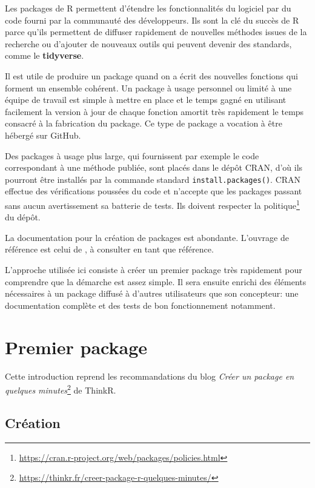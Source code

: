 \documentclass[
  11pt,
  french,
  a4paper,
  extrafontsizes,onecolumn,openright
  ]{memoir}
\begin{document}
Les packages de R permettent d'étendre les fonctionnalités du logiciel par du code fourni par la communauté des développeurs.
Ils sont la clé du succès de R parce qu'ils permettent de diffuser rapidement de nouvelles méthodes issues de la recherche ou d'ajouter de nouveaux outils qui peuvent devenir des standards, comme le \textbf{tidyverse}.

Il est utile de produire un package quand on a écrit des nouvelles fonctions qui forment un ensemble cohérent.
Un package à usage personnel ou limité à une équipe de travail est simple à mettre en place et le temps gagné en utilisant facilement la version à jour de chaque fonction amortit très rapidement le temps consacré à la fabrication du package.
Ce type de package a vocation à être hébergé sur GitHub.

Des packages à usage plus large, qui fournissent par exemple le code correspondant à une méthode publiée, sont placés dans le dépôt CRAN, d'où ils pourront être installés par la commande standard \texttt{install.packages()}.
CRAN effectue des vérifications poussées du code et n'accepte que les packages passant sans aucun avertissement sa batterie de tests.
Ils doivent respecter la politique\footnote{\url{https://cran.r-project.org/web/packages/policies.html}} du dépôt.

La documentation pour la création de packages est abondante.
L'ouvrage de référence est celui de \textcite{Wickham2015}, à consulter en tant que référence.

L'approche utilisée ici consiste à créer un premier package très rapidement pour comprendre que la démarche est assez simple.
Il sera ensuite enrichi des éléments nécessaires à un package diffusé à d'autres utilisateurs que son concepteur: une documentation complète et des tests de bon fonctionnement notamment.

\hypertarget{premier-package}{%
\section{Premier package}\label{premier-package}}

Cette introduction reprend les recommandations du blog \emph{Créer un package en quelques minutes}\footnote{\url{https://thinkr.fr/creer-package-r-quelques-minutes/}} de ThinkR.

\hypertarget{cruxe9ation}{%
\subsection{Création}\label{cruxe9ation}}
\end{document}
